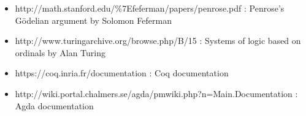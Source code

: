 \documentclass[10pt]{article}
\begin{document}
\begin{itemize}
\item http://math.stanford.edu/\%7Efeferman/papers/penrose.pdf : 
Penrose's Gödelian argument by Solomon Feferman

\item http://www.turingarchive.org/browse.php/B/15 : 
Systems of logic based on ordinals by Alan Turing

\item https://coq.inria.fr/documentation : 
Coq documentation

\item http://wiki.portal.chalmers.se/agda/pmwiki.php?n=Main.Documentation : 
Agda documentation

\end{itemize}
\end{document}
